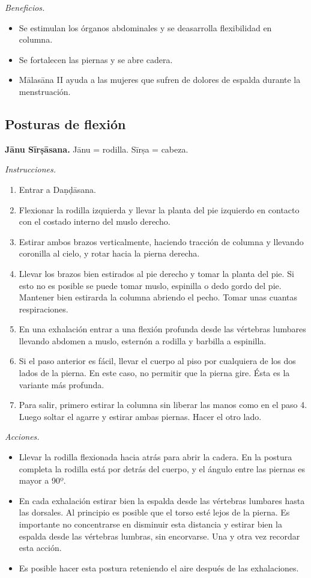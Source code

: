 \emph{Beneficios.}
\begin{itemize}
\item Se estimulan los órganos abdominales y
se deasarrolla flexibilidad en columna.
\item Se fortalecen las piernas y se abre
cadera.
\item Mālasāna II ayuda a las mujeres que
sufren de dolores de espalda durante la
menstruación.
\end{itemize}

\subsection{Posturas de flexión}
\label{section-posturas-de-flexion}

\medskip\noindent\textbf{Jānu Sīrṣāsana.}
Jānu = rodilla. Sīrṣa = cabeza.

\emph{Instrucciones.}
\begin{enumerate}
\item Entrar a Daṇḍāsana.
\item Flexionar la rodilla izquierda y llevar
la planta del pie izquierdo en contacto con
el costado interno del muslo derecho.
\item Estirar ambos brazos verticalmente,
haciendo tracción de columna y llevando
coronilla al cielo, y rotar hacia la pierna
derecha.
\item Llevar los brazos bien estirados al pie
derecho y tomar la planta del pie. Si esto no
es posible se puede tomar muslo, espinilla o
dedo gordo del pie. Mantener bien estirarda
la columna abriendo el pecho. Tomar unas
cuantas respiraciones.
\item En una exhalación entrar a una flexión
profunda desde las vértebras lumbares
llevando abdomen a muslo, esternón a rodilla
y barbilla a espinilla.
\item Si el paso anterior es fácil, llevar el
cuerpo al piso por cualquiera de los dos
lados de la pierna. En este caso, no permitir
que la pierna gire. Ésta es la variante más
profunda.
\item Para salir, primero estirar la columna
sin liberar las manos como en el paso 4.
Luego soltar el agarre y estirar ambas
piernas. Hacer el otro lado.
\end{enumerate}

\emph{Acciones.}
\begin{itemize}
\item Llevar la rodilla flexionada hacia
atrás para abrir la cadera. En la postura
completa la rodilla está por detrás del
cuerpo, y el ángulo entre las piernas es
mayor a 90º.
\item En cada exhalación estirar bien la
espalda desde las vértebras lumbares hasta
las dorsales. Al principio es posible que el
torso esté lejos de la pierna. Es importante
no concentrarse en disminuir esta distancia y
estirar bien la espalda desde las vértebras
lumbras, sin encorvarse. Una y otra vez
recordar esta acción.
\item Es posible hacer esta postura
reteniendo el aire después de las
exhalaciones.
\end{itemize}

